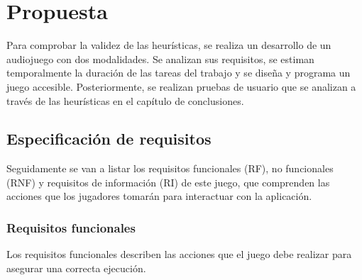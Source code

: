 \chapter{Propuesta}
Para comprobar la validez de las heurísticas, se realiza un desarrollo de un audiojuego con dos modalidades. Se analizan sus requisitos, se estiman temporalmente la duración de las tareas del trabajo y se diseña y programa un juego accesible. Posteriormente, se realizan pruebas de usuario que se analizan a través de las heurísticas en el capítulo de conclusiones.
\section{Especificación de requisitos}
Seguidamente se van a listar los requisitos funcionales (RF), no funcionales
(RNF) y requisitos de información (RI) de este juego, que comprenden las acciones que los jugadores tomarán para interactuar con la aplicación.
\subsection{Requisitos funcionales}
Los requisitos funcionales describen las acciones que el juego debe realizar para asegurar una correcta ejecución. 

